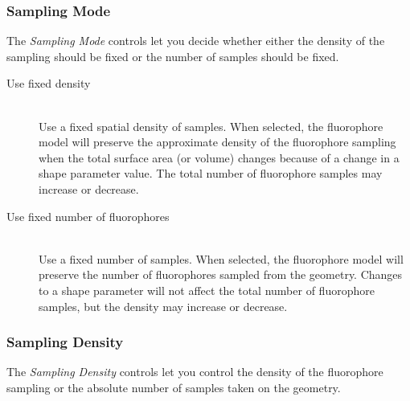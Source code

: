 \documentclass[11pt,titlepage,twoside]{article}
\begin{document}
\subsubsection{Sampling Mode}

The \emph{Sampling Mode} controls let you decide whether either the density of the sampling should be fixed or the number of samples should be fixed. 

\begin{description}

\item[Use fixed density] \hfill \\
Use a fixed spatial density of samples. When selected, the fluorophore model will preserve the approximate density of the fluorophore sampling when the total surface area (or volume) changes because of a change in a shape parameter value. The total number of fluorophore samples may increase or decrease.

\item[Use fixed number of fluorophores] \hfill \\
Use a fixed number of samples. When selected, the fluorophore model will preserve the number of fluorophores sampled from the geometry. Changes to a shape parameter will not affect the total number of fluorophore samples, but the density may increase or decrease.

\end{description}

\subsubsection{Sampling Density}

The \emph{Sampling Density} controls let you control the density of the fluorophore sampling or the absolute number of samples taken on the geometry.
\end{document}
